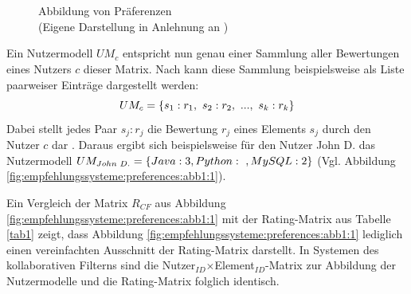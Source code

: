 \begin{figure}[H]
    \centering
    \\
    \\
  \caption[Abbildung von Präferenzen]{Abbildung von Präferenzen\\
	(Eigene Darstellung in Anlehnung an \cite[S. 198]{adomavicius:3:inbook})}\label{fig:empfehlungssysteme:preferences:abb1}
\end{figure}

Ein Nutzermodell $UM_{c}$ entspricht nun genau einer Sammlung aller Bewertungen eines Nutzers $c$ dieser Matrix.
Nach \textcite[S. 41]{berkovsky:2:article} kann diese Sammlung beispielsweise als Liste paarweiser Einträge dargestellt werden:
\begin{equation}\label{eq6}
    UM_{c} = \{s_{1}:r_{1},\textnormal{ }s_{2}:r_{2},\textnormal{ }...,\textnormal{ }s_{k}:r_{k}\}
\end{equation}
Dabei stellt jedes Paar $s_{j}:r_{j}$ die Bewertung $r_{j}$ eines Elements $s_{j}$ durch den Nutzer $c$ dar \cite[S. 41]{berkovsky:2:article}.
Daraus ergibt sich beispielsweise für den Nutzer John D. das Nutzermodell $UM_{John\textnormal{ }D.} = \{Java: 3, Python:\textnormal{ }, MySQL: 2\}$ (Vgl. Abbildung \ref{fig:empfehlungssysteme:preferences:abb1:1}).

Ein Vergleich der Matrix $R_{CF}$ aus Abbildung \ref{fig:empfehlungssysteme:preferences:abb1:1} mit der Rating-Matrix aus Tabelle \ref{tab1} zeigt, dass Abbildung \ref{fig:empfehlungssysteme:preferences:abb1:1} lediglich einen vereinfachten Ausschnitt der Rating-Matrix darstellt.
In Systemen des kollaborativen Filterns sind die Nutzer$_{ID}$$\times$Element$_{ID}$-Matrix zur Abbildung der Nutzermodelle und die Rating-Matrix folglich identisch.


